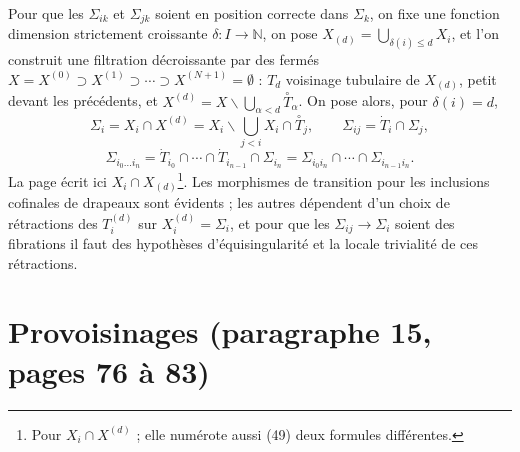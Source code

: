 \documentclass[11pt,a4paper]{article}
\begin{document}
Pour que les $\Sigma_{ik}$ et $\Sigma_{jk}$ soient en position correcte dans
$\Sigma_k$, on fixe une fonction dimension strictement croissante $\delta : I \to
\mathbb{N}$, on pose $X_{(d)} = \bigcup_{\delta(i) \leq d} X_i$, et l'on construit une
filtration décroissante par des fermés $X = X^{(0)} \supset X^{(1)} \supset \cdots
\supset X^{(N+1)} = \emptyset$ : $T_d$ voisinage tubulaire de $X_{(d)}$, petit devant
les précédents, et $X^{(d)} = X \smallsetminus \bigcup_{\alpha < d}
\overset{\circ}{T}_\alpha$. On pose alors, pour $\delta(i) = d$,
\[
\Sigma_i = X_i \cap X^{(d)} = X_i \smallsetminus \bigcup_{j<i} X_i \cap
\overset{\circ}{T}_j, \qquad \Sigma_{ij} = \dot T_i \cap \Sigma_j ,
\]
\[
\Sigma_{i_0 … i_n} = \dot T_{i_0} \cap \cdots \cap \dot T_{i_{n-1}} \cap
\Sigma_{i_n} = \Sigma_{i_0 i_n} \cap \cdots \cap \Sigma_{i_{n-1} i_n}.
\]
La page écrit ici $X_i \cap X_{(d)}$\footnote{Pour $X_i \cap X^{(d)}$ ; elle numérote
aussi (49) deux formules différentes.}.
Les morphismes de transition pour les inclusions cofinales de drapeaux sont
évidents ; les autres dépendent d'un choix de rétractions des $T_i^{(d)}$ sur
$X_i^{(d)} = \Sigma_i$, et pour que les $\Sigma_{ij} \to \Sigma_i$ soient des
fibrations il faut des hypothèses d'équisingularité et la locale trivialité de ces
rétractions.

\section*{Provoisinages (paragraphe 15, pages 76 à 83)}
\end{document}
